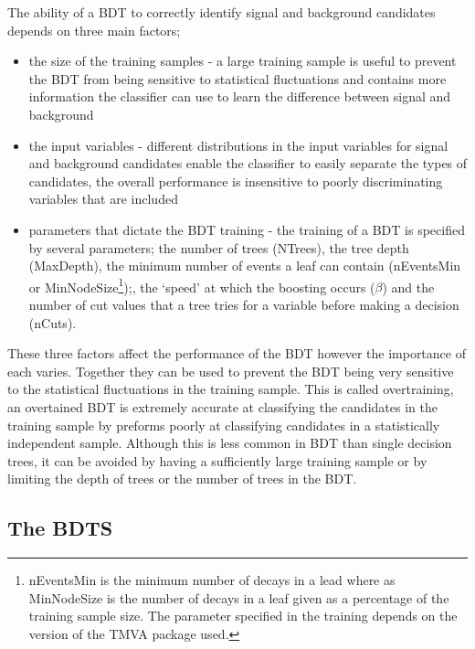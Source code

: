 The ability of a BDT to correctly identify signal and background candidates depends on three main factors;
\begin{itemize}
\item the size of the training samples - a large training sample is useful to prevent the BDT from being sensitive to statistical fluctuations and contains more information the classifier can use to learn the difference between signal and background
\item the input variables - different distributions in the input variables for signal and background candidates enable the classifier to easily separate the types of candidates, the overall performance is insensitive to poorly discriminating variables that are included
\item parameters that dictate the BDT training - the training of a BDT is specified by several parameters; the number of trees (NTrees), the tree depth (MaxDepth), the minimum number of events a leaf can contain (nEventsMin or MinNodeSize\footnote{nEventsMin is the minimum number of decays in a lead where as MinNodeSize is the number of decays in a leaf given as a percentage of the training sample size. The parameter specified in the training depends on the version of the TMVA package used. });, the `speed’ at which the boosting occurs ($\beta$) and the number of cut values that a tree tries for a variable before making a decision (nCuts).
\end{itemize}

These three factors affect the performance of the BDT however the importance of each varies. Together they can be used to prevent the BDT being very sensitive to the statistical fluctuations in the training sample. This  is called overtraining, an overtained BDT is extremely accurate at classifying the candidates in the training sample by preforms poorly at classifying candidates in a statistically independent sample. Although this is less common in BDT than single decision trees, it can be avoided by having a sufficiently large training sample or by limiting the depth of trees or the number of trees in the BDT. 

\subsection{The BDTS}
\label{BDTS}

